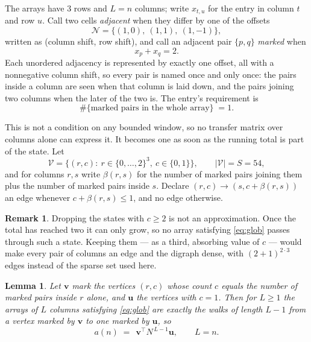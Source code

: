 \documentclass[11pt,a4paper]{article}
\theoremstyle{plain}
\newtheorem{lemma}[theorem]{Lemma}
\theoremstyle{definition}
\newtheorem{remark}[theorem]{Remark}
\begin{document}
The arrays have $3$ rows and $L=n$ columns; write $x_{t,u}$ for the entry in
column $t$ and row $u$. Call two cells \emph{adjacent} when they differ by one of the
offsets
\[
\mathcal N=\{(1,0),\ (1,1),\ (1,-1)\},
\]
written as (column shift, row shift), and call an adjacent pair $\{p,q\}$
\emph{marked} when
\[
x_{p}+x_{q}=2 .
\]
Each unordered adjacency is represented by exactly one offset, all with a nonnegative column
shift, so every pair is named once and only once: the pairs inside a column are seen when
that column is laid down, and the pairs joining two columns when the later of the two is. The
entry's requirement is
\begin{equation}\label{eq:glob}
\#\{\text{marked pairs in the whole array}\}\;=1.
\end{equation}

This is not a condition on any bounded window, so no transfer matrix over columns alone can
express it. It becomes one as soon as the running total is part of the state. Let
\[
\mathcal V=\bigl\{(r,c):\ r\in\{0,\dots,2\}^{3},\ c\in\{0,1\}\bigr\},
\qquad |\mathcal V|=S=54,
\]
and for columns $r,s$ write $\beta(r,s)$ for the number of marked pairs joining them plus the
number of marked pairs inside $s$. Declare $(r,c)\to(s,c+\beta(r,s))$ an edge whenever
$c+\beta(r,s)\le1$, and no edge otherwise.

\begin{remark}
Dropping the states with $c\ge2$ is not an approximation. Once the total has reached two it
can only grow, so no array satisfying \eqref{eq:glob} passes through such a state. Keeping
them --- as a third, absorbing value of $c$ --- would make every pair of columns an edge and
the digraph dense, with $(2+1)^{2\cdot3}$ edges instead of the sparse set used here.
\end{remark}

\begin{lemma}\label{lem:walk}
Let $\mathbf{v}$ mark the vertices $(r,c)$ whose count $c$ equals the number of marked pairs
inside $r$ alone, and $\mathbf{u}$ the vertices with $c=1$. Then for $L\ge1$ the arrays
of $L$ columns satisfying \eqref{eq:glob} are exactly the walks of length $L-1$ from a
vertex marked by $\mathbf{v}$ to one marked by $\mathbf{u}$, so
\[
a(n)\;=\;\,\mathbf{v}^{\!\top}N^{\,L-1}\mathbf{u},\qquad L=n .
\]
\end{lemma}
\end{document}
